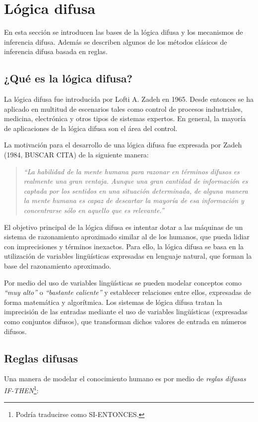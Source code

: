 \chapter{Lógica difusa}
\label{cha:logica-difusa}
En esta sección se introducen las bases de la lógica difusa y los mecanismos de inferencia difusa. Además se describen algunos de los métodos clásicos de inferencia difusa basada en reglas.

\section{¿Qué es la lógica difusa?}
La lógica difusa fue introducida por Lofti A. Zadeh en 1965. Desde entonces se ha aplicado en multitud de escenarios tales como control de procesos industriales, medicina, electrónica y otros tipos de sistemas expertos. En general, la mayoría de aplicaciones de la lógica difusa son el área del control.

La motivación para el desarrollo de una lógica difusa fue expresada por Zadeh (1984, BUSCAR CITA) de la siguiente manera:
\begin{quote}
\emph{``La habilidad de la mente humana para razonar en términos difusos es realmente una gran ventaja. Aunque una gran cantidad de información es captada por los sentidos en una situación determinada, de alguna manera la mente humana es capaz de descartar la mayoría de esa información y concentrarse sólo en aquello que es relevante.''}
\end{quote}
El objetivo principal de la lógica difusa es intentar dotar a las máquinas de un sistema de razonamiento aproximado similar al de los humanos, que pueda lidiar con imprecisiones y términos inexactos. Para ello, la lógica difusa se basa en la utilización de variables lingüísticas expresadas en lenguaje natural, que forman la base del razonamiento aproximado. 

Por medio del uso de variables lingüísticas se pueden modelar conceptos como \emph{``muy alto''} o \emph{``bastante caliente''} y establecer relaciones entre ellos, expresadas de forma matemática y algorítmica. Los sistemas de lógica difusa tratan la imprecisión de las entradas mediante el uso de variables lingüísticas (expresadas como conjuntos difusos), que transforman dichos valores de entrada en números difusos.

\section{Reglas difusas}
Una manera de modelar el conocimiento humano es por medio de \emph{reglas difusas IF-THEN}\footnote{Podría traducirse como SI-ENTONCES.}:

